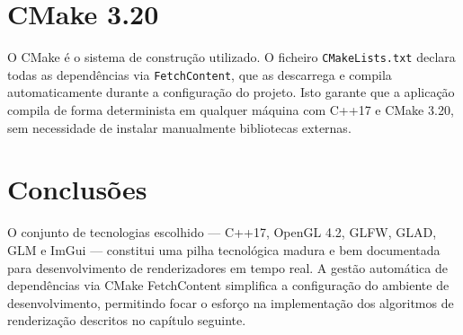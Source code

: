 \section{CMake 3.20}
\label{chap3:sec:cmake}

O CMake é o sistema de construção utilizado. O ficheiro \texttt{CMakeLists.txt} declara todas as dependências via \texttt{FetchContent}, que as descarrega e compila automaticamente durante a configuração do projeto. Isto garante que a aplicação compila de forma determinista em qualquer máquina com C++17 e CMake 3.20, sem necessidade de instalar manualmente bibliotecas externas.

\section{Conclusões}
\label{chap3:sec:concs}

O conjunto de tecnologias escolhido --- C++17, OpenGL 4.2, GLFW, GLAD, GLM e ImGui --- constitui uma pilha tecnológica madura e bem documentada para desenvolvimento de renderizadores em tempo real. A gestão automática de dependências via CMake FetchContent simplifica a configuração do ambiente de desenvolvimento, permitindo focar o esforço na implementação dos algoritmos de renderização descritos no capítulo seguinte.
